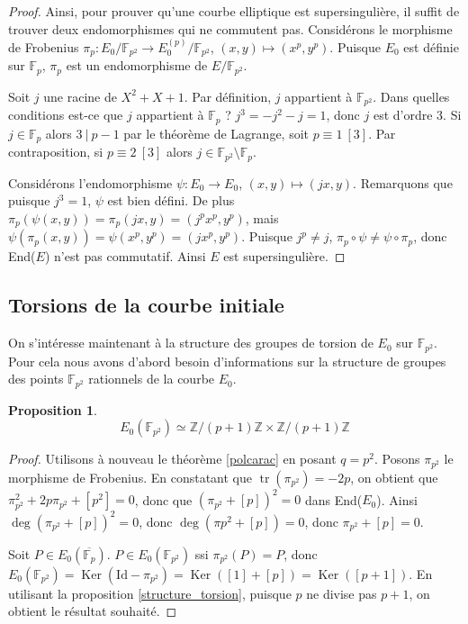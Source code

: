 \documentclass{article}
\theoremstyle{plain}%
\newtheorem{prop}[thm]{Proposition}
\theoremstyle{definition}%
\newcommand{\F}{\mathbb{F}}
\newcommand{\Z}{\mathbb{Z}}
\DeclareMathOperator{\tr}{tr}
\DeclareMathOperator{\Ker}{Ker}
\begin{document}
\begin{proof}
Ainsi, pour prouver qu'une courbe elliptique est supersingulière, il suffit de trouver deux endomorphismes qui ne commutent pas.
Considérons le morphisme de Frobenius $\pi_p : E_0/\F_{p^2} \to E_0^{(p)}/\F_{p^2}$, $(x, y) \mapsto (x^p, y^p)$. 
Puisque $E_0$ est définie sur $\F_{p}$, $\pi_p$ est un endomorphisme de $E/\F_{p^2}$.

Soit $j$ une racine de $X^2 + X + 1$. 
Par définition, $j$ appartient à $\F_{p^2}$. 
Dans quelles conditions est-ce que $j$ appartient à $\F_{p}$ ? 
$j^3 = -j^2 -j = 1$, donc $j$ est d'ordre $3$. 
Si $j\in \F_{p}$ alors $3\ |\ p-1$ par le théorème de Lagrange, soit $p\equiv 1\ [3]$. 
Par contraposition, si $p \equiv 2\ [3]$ alors $j\in\F_{p^2}\setminus\F_{p}$.

Considérons l'endomorphisme $\psi : E_0 \to E_0$, $(x, y) \mapsto (jx, y)$. 
Remarquons que puisque $j^3 = 1$, $\psi$ est bien défini.
De plus $\pi_p(\psi(x, y)) = \pi_p(jx, y) = (j^px^p, y^p)$, mais $\psi(\pi_p(x, y)) = \psi(x^p, y^p) = (jx^p, y^p)$. 
Puisque $j^p\neq j$, $\pi_p \circ \psi \neq \psi \circ \pi_p$, donc End($E$) n'est pas commutatif.
Ainsi $E$ est supersingulière.
\end{proof}


\subsection{Torsions de la courbe initiale}
\label{torsion_init}

On s'intéresse maintenant à la structure des groupes de torsion de $E_0$ sur $\F_{p^2}$. Pour cela nous avons d'abord besoin d'informations sur la structure de groupes des points $\F_{p^2}$ rationnels de la courbe $E_0$. 

\begin{prop}
  $$E_0(\F_{p^2}) \simeq \Z/(p+1)\Z \times \Z/(p+1)\Z$$
\end{prop}

\begin{proof}
  Utilisons à nouveau le théorème \ref{polcarac} en posant $q = p^2$. 
  Posons $\pi_{p^2}$ le morphisme de Frobenius.
  En constatant que $\tr(\pi_{p^2}) = -2p$, on obtient que $\pi_{p^2}^2 + 2p\pi_{p^2} + [p^2] = 0$, donc que $\left( \pi_{p^2} + [p] \right) ^2 = 0$ dans End($E_0$). 
  Ainsi $\deg(\pi_{p^2} + [p])^2 = 0$, donc $\deg(\pi{p^2} + [p]) = 0$, donc $\pi_{p^2} + [p] = 0$.

  Soit $P\in E_0(\overline{\F_{p}})$. $P \in E_0(\F_{p^2})$ ssi $\pi_{p^2}(P) = P$, donc $E_0(\F_{p^2}) = \Ker(\text{Id} - \pi_{p^2}) = \Ker([1] + [p]) = \Ker([p+1])$.
  En utilisant la proposition \ref{structure_torsion}, puisque $p$ ne divise pas $p+1$, on obtient le résultat souhaité.
\end{proof}
\end{document}
